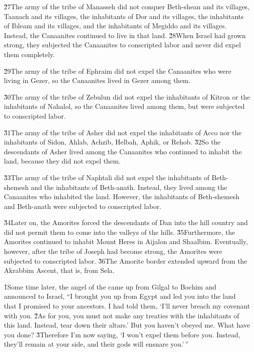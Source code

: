 \v{27}The army of the tribe of Manasseh did not conquer Beth-shean and its villages, Taanach and its villages, the inhabitants of Dor and its villages, the inhabitants of Ibleam and its villages, and the inhabitants of Megiddo and its villages. Instead, the Canaanites continued to live in that land. \v{28}When Israel had grown strong, they subjected the Canaanites to conscripted labor and never did expel them completely.

\v{29}The army of the tribe of Ephraim did not expel the Canaanites who were living in Gezer, so the Canaanites lived in Gezer among them.

\v{30}The army of the tribe of Zebulun did not expel the inhabitants of Kitron or the inhabitants of Nahalol, so the Canaanites lived among them, but were subjected to conscripted labor.

\v{31}The army of the tribe of Asher did not expel the inhabitants of Acco nor the inhabitants of Sidon, Ahlab, Achzib, Helbah, Aphik, or Rehob. \v{32}So the descendants of Asher lived among the Canaanites who continued to inhabit the land, because they did not expel them.

\v{33}The army of the tribe of Naphtali did not expel the inhabitants of Beth-shemesh and the inhabitants of Beth-anath. Instead, they lived among the Canaanites who inhabited the land. However, the inhabitants of Beth-shemesh and Beth-anath were subjected to conscripted labor.

\v{34}Later on, the Amorites forced the descendants of Dan into the hill country and did not permit them to come into the valleys of the hills. \v{35}Furthermore, the Amorites continued to inhabit Mount Heres in Aijalon and Shaalbim. Eventually, however, after the tribe of Joseph had become strong, the Amorites were subjected to conscripted labor. \v{36}The Amorite border extended upward from the Akrabbim Ascent, that is, from Sela.

\v{1}Some time later, the angel of the  came up from Gilgal to Bochim and announced to Israel, ``I brought you up from Egypt and led you into the land that I promised to your ancestors. I had told them, `I'll never breach my covenant with you. \v{2}As for you, you must not make any treaties with the inhabitants of this land. Instead, tear down their altars.' But you haven't obeyed me. What have you done? \v{3}Therefore I'm now saying, `I won't expel them before you. Instead, they'll remain at your side, and their gods will ensnare you.'\,''

